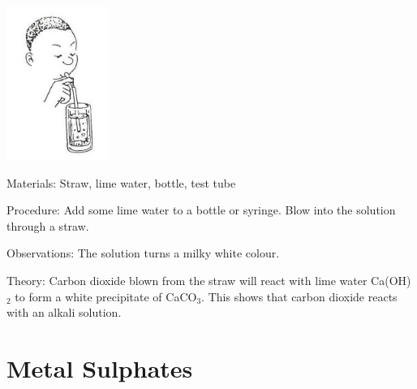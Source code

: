 \begin{multicols}{2}
\begin{center}
\includegraphics[width=0.25\textwidth]{./img/source/limewater.jpg}
\end{center}

\begin{description*}
\item[Materials:]{Straw, lime water, bottle, test tube}
\item[Procedure:]{Add some lime water to a bottle or syringe. Blow into the solution through a straw.}
\item[Observations:]{The solution turns a milky white colour.}
\item[Theory:]{Carbon dioxide blown from the straw will react with lime water Ca(OH)$_2$ to
form a white precipitate of CaCO$_3$. This shows that carbon dioxide reacts
with an alkali solution.}
\end{description*}

\columnbreak




\section*{Metal Sulphates}



\end{multicols}
